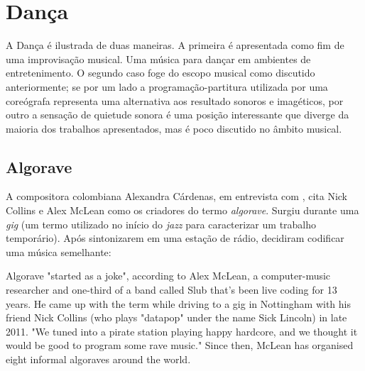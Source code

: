 \section{Dança}\label{sec:danca}

A Dança é ilustrada de duas maneiras. A primeira é apresentada como fim de uma improvisação musical. Uma música para dançar em ambientes de entretenimento. O segundo caso foge do escopo musical como discutido anteriormente; se por um lado a programação-partitura utilizada por uma coreógrafa representa uma alternativa aos resultado sonoros e imagéticos, por outro a sensação de quietude sonora é uma posição interessante que diverge da maioria dos trabalhos apresentados, mas é poco discutido no âmbito musical.

\subsection{Algorave}\label{sec:algorave}

A compositora colombiana Alexandra Cárdenas, em entrevista com , cita Nick Collins e Alex McLean como os criadores do termo \emph{algorave}. Surgiu durante uma \emph{gig} (um termo utilizado no início do \emph{jazz} para caracterizar um trabalho temporário). Após sintonizarem em uma estação de rádio, decidiram codificar uma música semelhante:

\begin{citacao}
{
Algorave "started as a joke", according to Alex McLean, a computer-music researcher and one-third of a band called Slub that's been live coding for 13 years. He came up with the term while driving to a gig in Nottingham with his friend Nick Collins (who plays "datapop" under the name Sick Lincoln) in late 2011. "We tuned into a pirate station playing happy hardcore, and we thought it would be good to program some rave music." Since then, McLean has organised eight informal algoraves around the world. 
}
\end{citacao}

